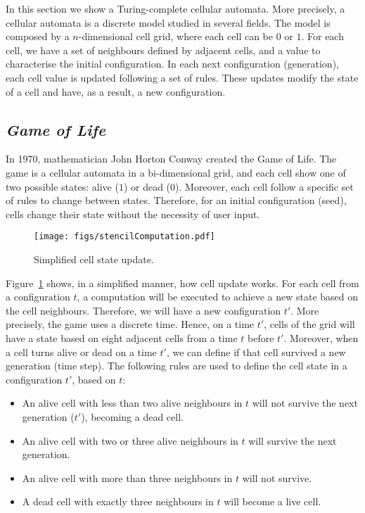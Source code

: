 \documentclass[12pt]{article}
\begin{document}
In this section we show a Turing-complete cellular automata. More precisely, a cellular automata is a discrete model studied in several fields. The model is composed by a $n$-dimensional cell grid, where each cell can be $0$ or $1$. For each cell, we have a set of neighbours defined by adjacent cells, and a value to characterise the initial configuration. In each next configuration (generation), each cell value is updated following a set of rules. These updates modify the state of a cell and have, as a result, a new configuration.

\subsection{\textit{Game of Life}}

In 1970, mathematician John Horton Conway created the Game of Life. The game is a cellular automata in a bi-dimensional grid, and each cell show one of two possible states: alive ($1$) or dead ($0$). Moreover, each cell follow a specific set of rules to change between states. Therefore, for an initial configuration (seed), cells change their state without the necessity of user input.

\begin{figure}[h]
    \centering
    \texttt{[image: figs/stencilComputation.pdf]}
    \caption{Simplified cell state update.}
    \label{fig:stencil}
\end{figure}

Figure~\ref{fig:stencil} shows, in a simplified manner, how cell update works. For each cell from a configuration $t$, a computation will be executed to achieve a new state based on the cell neighbours. Therefore, we will have a new configuration $t'$. More precisely, the game uses a discrete time. Hence, on a time $t'$, cells of the grid will have a state based on eight adjacent cells from a time $t$ before $t'$. Moreover, when a cell turns alive or dead on a time $t'$, we can define if that cell survived a new generation (time step). The following rules are used to define the cell state in a configuration $t'$, based on $t$:

\begin{itemize}
    \item An alive cell with less than two alive neighbours in $t$ will not survive the next generation ($t'$), becoming a dead cell.
    \item An alive cell with two or three alive neighbours in $t$ will survive the next generation.
    \item An alive cell with more than three neighbours in $t$ will not survive.
    \item A dead cell with exactly three neighbours in $t$ will become a live cell.
\end{itemize}
\end{document}
